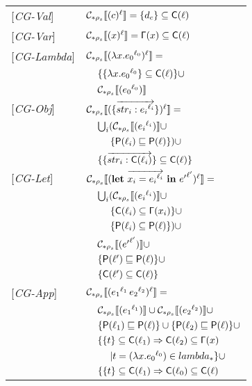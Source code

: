 \documentclass[[12pt,a4paper,twoside,openrigh]{article}
\newcommand{\lbt}[1]{{e_#1}^{\ell_#1}}
\newcommand{\letexprs}[3]{\mathbf{let}\ \vec{#1 = #2}\ \mathbf{in}\ #3}
\begin{document}
\begin{tabular}{l l l l}
{[\textit{CG-Val}]} & \multicolumn{3}{l}{$ \mathcal{C}_{*\rho_s}\llbracket (c)^\ell \rrbracket = \{d_c\} \subseteq \mathsf{C}(\ell)$} \\ 
{[\textit{CG-Var}]} & \multicolumn{3}{l}{$ \mathcal{C}_{*\rho_s}\llbracket (x)^\ell \rrbracket = \mathsf{\Gamma}(x) \subseteq \mathsf{C}(\ell)$} \\ 
{[\textit{CG-Lambda}]} & \multicolumn{3}{l}{$ \genl {\lam{x}{\lbt 0}} = $}\\
&& \multicolumn{2}{l}{$\{\{\lam{x}{\lbt 0}\} \subseteq \Cel(\ell)\}\cup $}\\
&& \multicolumn{2}{l}{$ \gen {\lbt 0} $} \\
{[\textit{CG-Obj}]} & \multicolumn{3}{l}{$ \genl {\rec{\vec{str_i : \lbt i}}} = $}\\
&& \multicolumn{2}{l}{$\bigcup_i (\gen {\lbt i} \cup$}\\
&&& $\{\mathsf{P}(\ell_i) \sqsubseteq \mathsf{P}(\ell)\})\cup$\\ 
&& \multicolumn{2}{l}{$\{ \{\overrightarrow{str_i : \mathsf{C}(\ell_i)}\} \subseteq \mathsf{C}(\ell) \} $} \\
{[\textit{CG-Let}]} & \multicolumn{3}{l}{$\genl {\letexprs{x_i}{\lbt i}{{e'}^{\ell'}}} = $}\\
&& \multicolumn{2}{l}{$ \bigcup_i (\gen {\lbt i} \cup$ }\\
&&& $ \{\mathsf{C}(\ell_i) \subseteq \mathsf{\Gamma}(x_i)\} \cup$ \\
&&& $ \{ \mathsf{P}(\ell_i) \subseteq \mathsf{P}(\ell) \}) \cup $ \\
&& \multicolumn{2}{l}{$ \mathcal{C}_{*\rho_s}\llbracket ({e'}^{\ell'}) \rrbracket \cup$} \\
&& \multicolumn{2}{l}{$ \{\mathsf{P}(\ell') \sqsubseteq \mathsf{P}(\ell)\} \cup$}\\
&& \multicolumn{2}{l}{$ \{\mathsf{C}(\ell') \subseteq \mathsf{C}(\ell)\} $}\\
{[\textit{CG-App}]}&\multicolumn{3}{l}{$ \genl {\appl {\lbt 1} {\lbt 2}} = $}\\
&& \multicolumn{2}{l}{$\gen {\lbt 1} \cup \gen {\lbt 2} \cup$} \\
&& \multicolumn{2}{l}{$\{ \mathsf{P}(\ell_1) \sqsubseteq \mathsf{P}(\ell) \} \cup \{ \mathsf{P}(\ell_2) \sqsubseteq \mathsf{P}(\ell) \}\cup$} \\
&& \multicolumn{2}{l}{$\{\{ t \} \subseteq \mathsf{C}(\ell_1) \Rightarrow \mathsf{C}(\ell_2) \subseteq \mathsf{\Gamma}(x)$}\\
&&&$| t = (\lam {x} {\lbt 0}) \in lambda_* \}\cup$\\
&& \multicolumn{2}{l}{$\{\{ t \} \subseteq \mathsf{C}(\ell_1) \Rightarrow \mathsf{C}(\ell_0) \subseteq \mathsf{C}(\ell)$}\\

\end{tabular}
\end{document}
